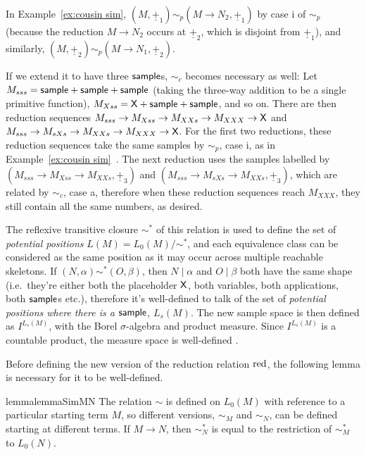 \begin{example}
In Example~\ref{ex:cousin sim}, $(M,\underline{+}_1) \sim_p (M \to N_2,\underline{+}_1)$ by case i of $\sim_p$ (because the reduction $M \to N_2$ occurs at $\underline{+}_2$, which is disjoint from $\underline{+}_1$), and similarly, $(M,\underline{+}_2) \sim_p (M \to N_1,\underline{+}_2)$.

If we extend it to have three $\mathsf{sample}$s, $\sim_c$ becomes necessary as well: Let $M_{sss} = \mathsf{sample} + \mathsf{sample} + \mathsf{sample}$ (taking the three-way addition to be a single primitive function), $M_{Xss} = \mathsf{X} + \mathsf{sample} + \mathsf{sample}$, and so on. There are then reduction sequences $M_{sss} \to M_{Xss} \to M_{XXs} \to M_{XXX} \to \mathsf{X}$ and $M_{sss} \to M_{sXs} \to M_{XXs} \to M_{XXX} \to \mathsf{X}$. For the first two reductions, these reduction sequences take the same samples by $\sim_p$, case i, as in Example~\ref{ex:cousin sim}~. The next reduction uses the samples labelled by $(M_{sss} \to M_{Xss} \to M_{XXs}, \underline{+}_3)$ and $(M_{sss} \to M_{sXs} \to M_{XXs}, \underline{+}_3)$, which are related by $\sim_c$, case a, therefore when these reduction sequences reach $M_{XXX}$, they still contain all the same numbers, as desired.
\end{example}

The reflexive transitive closure $\sim^*$ of this relation is used to define the set of \emph{potential positions} $L(M) = L_0(M) / \sim^*$, and each equivalence class can be considered as the same position as it may occur across multiple reachable skeletons. 
If $(N,\alpha) \sim^* (O,\beta)$, then $N \mid \alpha$ and $O \mid \beta$ both have the same shape (i.e.~they're either both the placeholder $\mathsf{X}$, both variables, both applications, both $\mathsf{sample}$s etc.), therefore it's well-defined to talk of the set of \emph{potential positions where there is a $\mathsf{sample}$}, $L_s(M)$.
The new sample space is then defined as $I^{L_s(M)}$, with the Borel $\sigma$-algebra and product measure.
Since $I^{L_s(M)}$ is a countable product, the measure space is well-defined \cite[Cor.~2.7.3]{AshDD00}.

\medskip
Before defining the new version of the reduction relation $\operatorname{red}$, the following lemma is necessary for it to be well-defined.

\begin{restatable}{lemma}{lemmaSimMN}
\label{lem:sim-M-N}
The relation $\sim$ is defined on $L_0(M)$ with reference to a particular starting term $M$, so different versions, $\sim_M$ and $\sim_N$, can be defined starting at different terms. If $M \to N$, then $\sim^*_N$ is equal to the restriction of $\sim^*_M$ to $L_0(N)$.
\end{restatable} 


